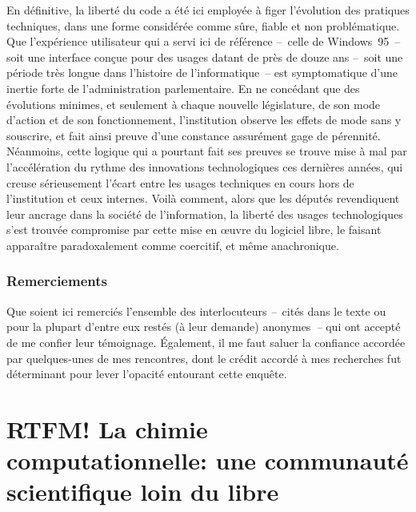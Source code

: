 \documentclass{FramateX}
\begin{document}
\begin{refsection}
En définitive, la liberté du code a été ici employée à figer l'évolution
des pratiques techniques, dans une forme considérée comme sûre, fiable
et non problématique. Que l'expérience utilisateur qui a servi ici de
référence –~celle de Windows~95~– soit une interface conçue pour des
usages datant de près de douze ans –~soit une période très longue dans
l'histoire de l'informatique~– est symptomatique d'une inertie forte de
l'administration parlementaire. En ne concédant que des évolutions
minimes, et seulement à chaque nouvelle législature, de son mode
d'action et de son fonctionnement, l'institution observe les effets de
mode sans y souscrire, et fait ainsi preuve d'une constance assurément
gage de pérennité. Néanmoins, cette logique qui a pourtant fait ses
preuves se trouve mise à mal par l'accélération du rythme des
innovations technologiques ces dernières années, qui creuse
sérieusement l'écart entre les usages techniques en cours hors de
l'institution et ceux internes. Voilà comment, alors que les députés
revendiquent leur ancrage dans la société de l'information, la liberté
des usages technologiques s'est trouvée compromise par cette mise en
œuvre du logiciel libre, le faisant apparaître paradoxalement comme
coercitif, et même anachronique.

\subsection*{Remerciements}
{}

Que soient ici remerciés l'ensemble des interlocuteurs \textit{–~}cités
dans le texte ou pour la plupart d'entre eux restés (à leur demande)
anonymes~\textit{–} qui ont accepté de me confier leur témoignage.
Également, il me faut saluer la confiance accordée par quelques-unes de
mes rencontres, dont le crédit accordé à mes recherches fut déterminant
pour lever l'opacité entourant cette enquête.
\nocite{abelesethnologue2001,abelespour1995,courtytravail2005,
denouelcommuniquer2011,frayssinetbureaucratique1981,Jamous1978,latourscience2005,
urvoasmanuel2012,zetlaouiparlement2011}

\printbibliography[heading=subbibliography]
\end{refsection}

\chapter*{RTFM! La chimie computationnelle: une communauté scientifique loin du libre} 
{}
\end{document}
